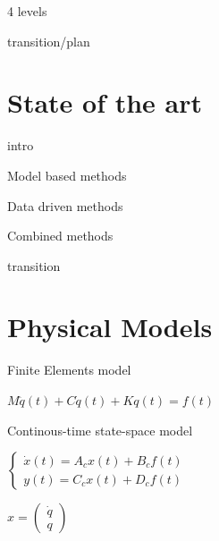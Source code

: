 \documentclass{beamer}
\begin{document}
\begin{frame}{4 levels}
\end{frame}


\begin{frame}{transition/plan}
\end{frame}


\section{State of the art}


\begin{frame}{intro}
\end{frame}


\begin{frame}{Model based methods}
\end{frame}


\begin{frame}{Data driven methods}
\end{frame}


\begin{frame}{Combined methods}
\end{frame}


\begin{frame}{transition}
\end{frame}


\section{Physical Models}


\begin{frame}{Finite Elements model}

\begin{center}
$M \ddot{q}(t) + C \dot{q}(t) + K q(t) = f(t)$
\end{center}

\end{frame}


\begin{frame}{Continous-time state-space model}

\begin{center}
$\left\{
\begin{array}{ll}
\dot{x}(t) = A_cx(t) + B_cf(t) \\
y(t) = C_cx(t) + D_cf(t)
\end{array}
\right.$
\end{center}

$x =
\begin{pmatrix}
\dot{q} \\
q
\end{pmatrix}$

\end{frame}
\end{document}
